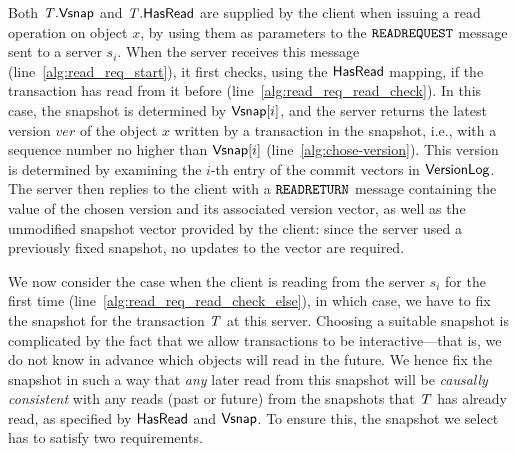 Both $\mathit{T}.\mathsf{Vsnap}$ and $\mathit{T}.\mathsf{HasRead}$ are supplied by the client when issuing a read operation on object $x$, by using them as parameters to the ${\tt READREQUEST}$ message sent to a server $s_i$. When the server receives this message (line~\ref{alg:read_req_start}), it first checks, using the $\mathsf{HasRead}$ mapping, if the transaction has read from it before (line~\ref{alg:read_req_read_check}). In this case, the snapshot is determined by $\mathsf{Vsnap}[i]$, and the server returns the latest version $\mathit{ver}$ of the object $x$ written by a transaction in the snapshot, i.e., with a sequence number no higher than $\mathsf{Vsnap}[i]$ (line~\ref{alg:chose-version}). This version is determined by examining the $i$-th entry of the commit vectors in $\mathsf{VersionLog}$. The server then replies to the client with a ${\tt READRETURN}$ message containing the value of the chosen version and its associated version vector, as well as the unmodified snapshot vector provided by the client: since the server used a previously fixed snapshot, no updates to the vector are required.


We now consider the case when the client is reading from the server $s_i$ for the first time (line~\ref{alg:read_req_read_check_else}), in which case, we have to fix the snapshot for the transaction $\mathit{T}$ at this server. Choosing a suitable snapshot is complicated by the fact that we allow transactions to be interactive---that is, we do not know in advance which objects will read in the future. We hence fix the snapshot in such a way that \emph{any} later read from this snapshot will be \emph{causally consistent}  with any reads (past or future) from the snapshots that $\mathit{T}$ has already read, as specified by $\mathsf{HasRead}$ and $\mathsf{Vsnap}$. To ensure this, the snapshot we select has to satisfy two requirements.

